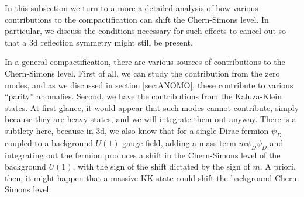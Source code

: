 \documentclass[12pt]{article}%
\numberwithin{equation}{section}
\renewcommand{\(}{\left(}
\renewcommand{\)}{\right)}
\renewcommand{\[}{\left[}
\renewcommand{\]}{\right]}
\begin{document}
In this subsection we turn to a more a detailed analysis of how various contributions to the
compactification can shift the Chern-Simons level. In particular, we discuss the conditions necessary for
such effects to cancel out so that a 3d reflection symmetry might still be present.

In a general compactification, there are various sources of contributions to the Chern-Simons level.
First of all, we can study the contribution from the zero modes, and as we discussed in section \ref{sec:ANOMO},
these contribute to various ``parity'' anomalies. Second, we have the contributions from the Kaluza-Klein states.
At first glance, it would appear that such modes cannot contribute, simply because they are heavy states, and we will integrate them out anyway.
There is a subtlety here, because in 3d, we also know that for a single Dirac fermion $\psi_{D}$ coupled to a background $U(1)$ gauge field,
adding a mass term $m \overline{\psi_{D}} \psi_{D}$ and integrating out the fermion produces a shift in the Chern-Simons level of the background $U(1)$, with the sign of the shift dictated by the sign of $m$. A priori, then, it might happen that a massive KK state could shift the background Chern-Simons level.
\end{document}
